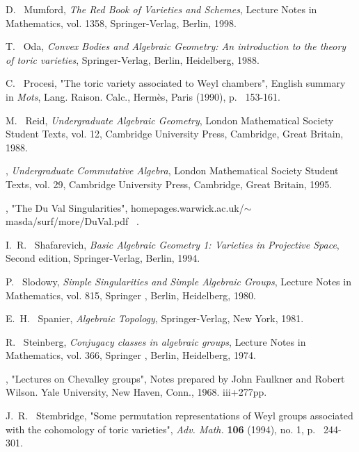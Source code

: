 \documentclass[BSc]{usydthesis}
\numberwithin{equation}{chapter}
\theoremstyle{remark}
\begin{document}
\begin{thebibliography}{10}
{\sc D.~ Mumford}, {\em The Red Book of Varieties and Schemes}, Lecture Notes in Mathematics, vol. 1358, Springer-Verlag, Berlin, 1998.  

{\sc T.~ Oda}, {\em Convex Bodies and Algebraic Geometry: An introduction to the theory of toric varieties}, Springer-Verlag, Berlin, Heidelberg, 1988.

{\sc C.~ Procesi}, "The toric variety associated to Weyl chambers", English summary in {\em Mots}, Lang. Raison. Calc., Herm\`{e}s, Paris (1990), p.~ 153-161.

{\sc M.~ Reid}, {\em Undergraduate Algebraic Geometry}, London Mathematical Society Student Texts, vol. 12, Cambridge University Press, Cambridge, Great Britain, 1988.

\vrule height 2pt depth -1.6pt width 23pt, {\em Undergraduate Commutative Algebra}, London Mathematical Society Student Texts, vol. 29, Cambridge University Press, Cambridge, Great Britain, 1995.

\vrule height 2pt depth -1.6pt width 23pt, "The Du Val Singularities", homepages.warwick.ac.uk/$\sim$masda/surf/more/DuVal.pdf ~. 

{\sc I.~R.~ Shafarevich}, {\em Basic Algebraic Geometry 1: Varieties in Projective Space}, Second edition, Springer-Verlag, Berlin, 1994. 

{\sc P.~ Slodowy}, {\em Simple Singularities and Simple Algebraic Groups}, Lecture Notes in Mathematics, vol. 815, Springer , Berlin, Heidelberg, 1980.

{\sc E.~H.~ Spanier}, {\em Algebraic Topology}, Springer-Verlag, New York, 1981.

{\sc R.~ Steinberg}, {\em Conjugacy classes in algebraic groups}, Lecture Notes in Mathematics, vol. 366, Springer , Berlin, Heidelberg, 1974.

\vrule height 2pt depth -1.6pt width 23pt, "Lectures on Chevalley groups", Notes prepared by John Faulkner and Robert Wilson. Yale University, New Haven, Conn., 1968. iii+277pp.

{\sc J.~R.~ Stembridge}, "Some permutation representations of Weyl groups associated with the cohomology of toric varieties", {\em Adv. Math.} {\bf 106} (1994), no. 1, p.~ 244-301.



\end{thebibliography}
\end{document}
